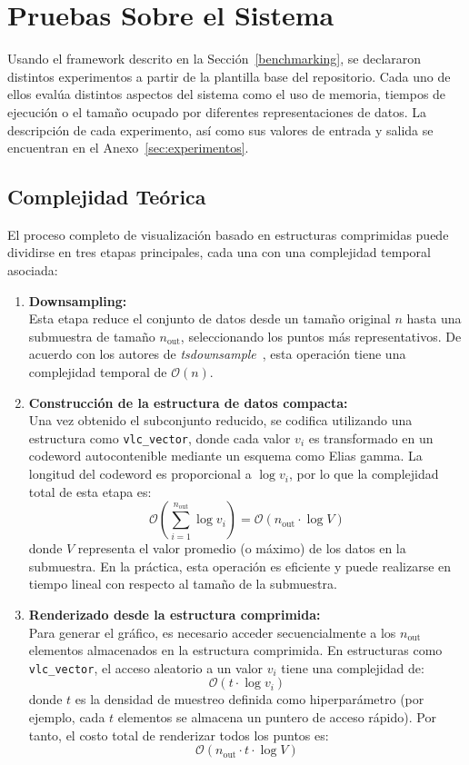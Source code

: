 \section{Pruebas Sobre el Sistema}
\label{sec:pruebas-sistema}

Usando el framework descrito en la Sección~\ref{benchmarking}, se declararon distintos experimentos a partir de la plantilla base del repositorio. Cada uno de ellos evalúa distintos aspectos del sistema como el uso de memoria, tiempos de ejecución o el tamaño ocupado por diferentes representaciones de datos. La descripción de cada experimento, así como sus valores de entrada y salida se encuentran en el Anexo~\ref{sec:experimentos}.

\subsection{Complejidad Teórica}

El proceso completo de visualización basado en estructuras comprimidas puede dividirse en tres etapas principales, cada una con una complejidad temporal asociada:

\begin{enumerate}
    \item \textbf{Downsampling:} \\
    Esta etapa reduce el conjunto de datos desde un tamaño original \(n\) hasta una submuestra de tamaño \(n_{\text{out}}\), seleccionando los puntos más representativos. De acuerdo con los autores de \textit{tsdownsample}~\cite{tsdownsample}, esta operación tiene una complejidad temporal de \(\mathcal{O}(n)\).

    \item \textbf{Construcción de la estructura de datos compacta:} \\
    Una vez obtenido el subconjunto reducido, se codifica utilizando una estructura como \texttt{vlc\_vector}, donde cada valor \(v_i\) es transformado en un codeword autocontenible mediante un esquema como Elias gamma. La longitud del codeword es proporcional a \(\log v_i\), por lo que la complejidad total de esta etapa es:
    \[
    \mathcal{O}\left( \sum_{i=1}^{n_{\text{out}}} \log v_i \right) = \mathcal{O}(n_{\text{out}} \cdot \log V)
    \]
    donde \(V\) representa el valor promedio (o máximo) de los datos en la submuestra. En la práctica, esta operación es eficiente y puede realizarse en tiempo lineal con respecto al tamaño de la submuestra.

    \item \textbf{Renderizado desde la estructura comprimida:} \\
    Para generar el gráfico, es necesario acceder secuencialmente a los \(n_{\text{out}}\) elementos almacenados en la estructura comprimida. En estructuras como \texttt{vlc\_vector}, el acceso aleatorio a un valor \(v_i\) tiene una complejidad de:
    \[
    \mathcal{O}(t \cdot \log v_i)
    \]
    donde \(t\) es la densidad de muestreo definida como hiperparámetro (por ejemplo, cada \(t\) elementos se almacena un puntero de acceso rápido). Por tanto, el costo total de renderizar todos los puntos es:
    \[
    \mathcal{O}(n_{\text{out}} \cdot t \cdot \log V)
    \]
\end{enumerate}

